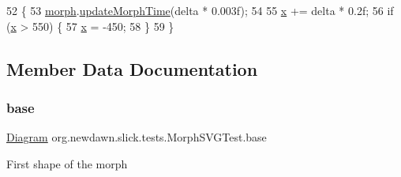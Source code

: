 \begin{DoxyCode}
52                                   \{
53         \mbox{\hyperlink{classorg_1_1newdawn_1_1slick_1_1tests_1_1_morph_s_v_g_test_a2690459557274439020ce1df8ecd40e6}{morph}}.\mbox{\hyperlink{classorg_1_1newdawn_1_1slick_1_1svg_1_1_s_v_g_morph_afba9cd5655c85ee202a36f57afdbb86d}{updateMorphTime}}(delta * 0.003f);
54         
55         \mbox{\hyperlink{classorg_1_1newdawn_1_1slick_1_1tests_1_1_morph_s_v_g_test_a057720812f0ba829cbcdde70d9a037cf}{x}} += delta * 0.2f;
56         \textcolor{keywordflow}{if} (\mbox{\hyperlink{classorg_1_1newdawn_1_1slick_1_1tests_1_1_morph_s_v_g_test_a057720812f0ba829cbcdde70d9a037cf}{x}} > 550) \{
57             \mbox{\hyperlink{classorg_1_1newdawn_1_1slick_1_1tests_1_1_morph_s_v_g_test_a057720812f0ba829cbcdde70d9a037cf}{x}} = -450;
58         \}
59     \}
\end{DoxyCode}


\subsection{Member Data Documentation}
\mbox{\label{classorg_1_1newdawn_1_1slick_1_1tests_1_1_morph_s_v_g_test_a48bdfb5f5bb3f489b24b8b13df4ff87e}} 
\subsubsection{\texorpdfstring{base}{base}}
{\footnotesize\ttfamily \mbox{\hyperlink{classorg_1_1newdawn_1_1slick_1_1svg_1_1_diagram}{Diagram}} org.\+newdawn.\+slick.\+tests.\+Morph\+S\+V\+G\+Test.\+base\hspace{0.3cm}{\ttfamily [private]}}

First shape of the morph \mbox{\label{classorg_1_1newdawn_1_1slick_1_1tests_1_1_morph_s_v_g_test_a2690459557274439020ce1df8ecd40e6}} 

